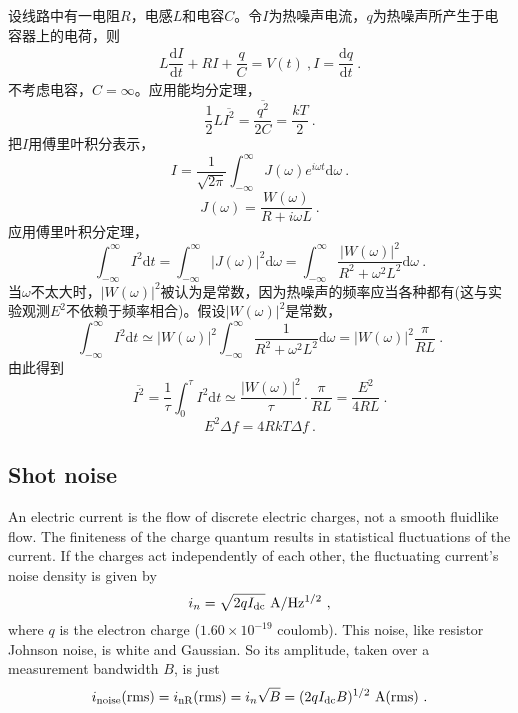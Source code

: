 \documentclass[11pt,a4paper]{article}
\newcommand{\dif}{\mathrm{d}}
\begin{document}
设线路中有一电阻$R$，电感$L$和电容$C$。令$I$为热噪声电流，$q$为热噪声所产生于电容器上的电荷，则
\begin{align}
L \dfrac{\dif I}{\dif t} +RI +\dfrac{q}{C} = V(t) ~, 
I = \dfrac{\dif q}{\dif t} ~.
\end{align}
不考虑电容，$C = \infty$。应用能均分定理，
\begin{equation}
\dfrac{1}{2} L \overline{I^2} = \dfrac{\overline{q^2}}{2C} = \dfrac{kT}{2} ~.
\end{equation}
把$I$用傅里叶积分表示，
\begin{equation}
I  = \dfrac{1}{\sqrt{2\pi} } \int_{-\infty}^\infty J(\omega) e^{i\omega t} \dif \omega ~.
\end{equation}
\begin{equation}
J(\omega) = \frac{W(\omega)}{R+i \omega L} ~.
\end{equation}
应用傅里叶积分定理，
\begin{equation}
 \int_{-\infty}^\infty I^2 \dif t =  \int_{-\infty}^\infty |J(\omega)|^2 \dif \omega = \int_{-\infty}^\infty \frac{|W(\omega)|^2 }{R^2+ \omega^2 L^2} \dif \omega ~.
\end{equation}
当$\omega$不太大时，$|W(\omega)|^2$被认为是常数，因为热噪声的频率应当各种都有(这与实验观测$E^2$不依赖于频率相合)。假设$|W(\omega)|^2$是常数，
\begin{equation}
 \int_{-\infty}^\infty I^2 \dif t \simeq |W(\omega)|^2 \int_{-\infty}^\infty \frac{1}{R^2+ \omega^2 L^2} \dif \omega = |W(\omega)|^2 \dfrac{\pi}{RL} ~.
\end{equation}
由此得到
\begin{equation}
\overline{I^2} = \dfrac{1}{\tau}  \int_{0}^\tau I^2 \dif t  \simeq \dfrac{ |W(\omega)|^2}{\tau} \cdot \dfrac{\pi}{RL} = \dfrac{E^2}{4RL} ~.
\end{equation}
\begin{equation}
E^2 \Delta f = 4RkT \Delta f ~.
\end{equation}








\subsection{Shot noise}
\cite{2015arel.book.....H} An electric current is the flow of discrete electric charges, not a smooth fluidlike flow. The finiteness of the charge quantum results in statistical fluctuations of the current. If the charges act independently of each other, the fluctuating current's noise density is given by
\begin{equation}
i_n = \sqrt{2 q I_{\rm dc} } ~{\rm A/Hz^{1/2} } ~,
\end{equation}
where $q$ is the electron charge ($1.60 \times 10^{-19}$ coulomb). This noise, like resistor Johnson noise, is white and Gaussian. So its amplitude, taken over a measurement bandwidth $B$, is just
\begin{equation}
i_{\rm noise} ({\rm rms}) = i_{\rm n R} ({\rm rms}) = i_n \sqrt{B} = (2 q I_{\rm dc} B)^{1/2} ~{\rm A( rms)} ~.
\end{equation}
\end{document}
